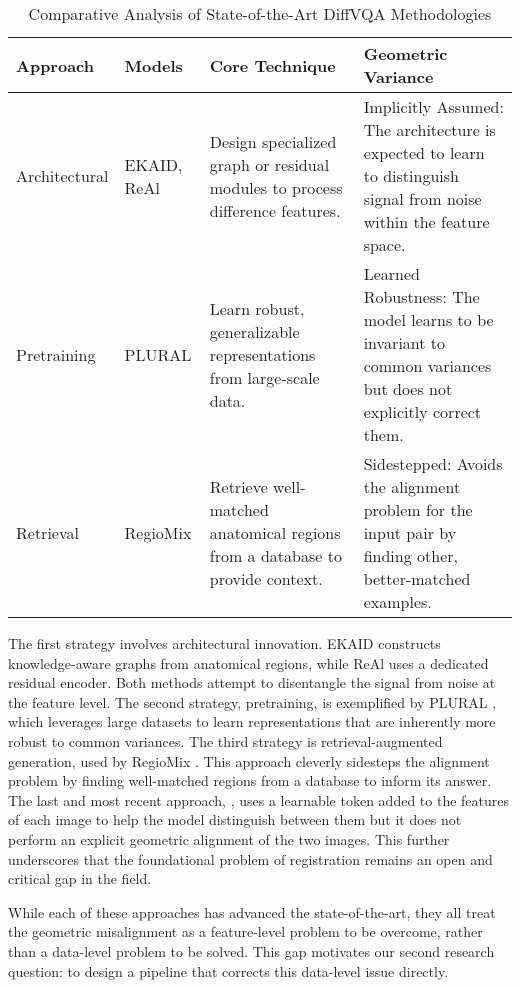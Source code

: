 \begin{table}[h!]
	\centering
	\caption{Comparative Analysis of State-of-the-Art DiffVQA Methodologies}
	\label{tab:diffvqa_comparison}
	\begin{tabular}{|l|l|p{5cm}|p{6cm}|}
		\hline
		\textbf{Approach} & \textbf{Models} & \textbf{Core Technique} & \textbf{Geometric Variance} \\ \hline \hline
		Architectural & EKAID, ReAl & Design specialized graph or residual modules to process difference features. & Implicitly Assumed: The architecture is expected to learn to distinguish signal from noise within the feature space. \\ \hline
		Pretraining & PLURAL & Learn robust, generalizable representations from large-scale data. & Learned Robustness: The model learns to be invariant to common variances but does not explicitly correct them. \\ \hline
		Retrieval & RegioMix & Retrieve well-matched anatomical regions from a database to provide context. & Sidestepped: Avoids the alignment problem for the input pair by finding other, better-matched examples. \\ \hline
	\end{tabular}
\end{table}

The first strategy involves architectural innovation. EKAID \cite{ekaid} constructs knowledge-aware graphs from anatomical regions, while ReAl \cite{real} uses a dedicated residual encoder. Both methods attempt to disentangle the signal from noise at the feature level. The second strategy, pretraining, is exemplified by PLURAL \cite{plural}, which leverages large datasets to learn representations that are inherently more robust to common variances. The third strategy is retrieval-augmented generation, used by RegioMix \cite{regiomix}. This approach cleverly sidesteps the alignment problem by finding well-matched regions from a database to inform its answer. The last and most recent approach, \cite{encoder-decoder}, uses a learnable token added to the features of each image to help the model distinguish between them but it does not perform an explicit geometric alignment of the two images. This further underscores that the foundational problem of registration remains an open and critical gap in the field.


While each of these approaches has advanced the state-of-the-art, they all treat the geometric misalignment as a feature-level problem to be overcome, rather than a data-level problem to be solved. This gap motivates our second research question: to design a pipeline that corrects this data-level issue directly.


